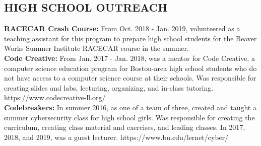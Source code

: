 \documentclass{res}
\begin{document}
\begin{resume}
\section{HIGH SCHOOL OUTREACH}
\vspace{0.1in}

\textbf{RACECAR Crash Course:} From Oct. 2018 - Jan. 2019, volunteered as a teaching assistant for
this program to prepare high school students for the Beaver Works Summer Institute RACECAR course in the summer. \\
\textbf{Code Creative:} From Jan. 2017 - Jan. 2018, was a mentor for Code Creative, a computer science education
program for Boston-area high school students who do not have access to a computer science course at their schools.
Was responsible for creating slides and labs, lecturing, organizing, and in-class tutoring.
https://www.codecreative-ll.org/ \\
\textbf{Codebreakers:} In summer 2016, as one of a team of three, created and taught a summer cybersecurity class for
high school girls.  Was responsible for creating the curriculum, creating class material and exercises, and leading
classes.  In 2017, 2018, and 2019, was a guest lecturer.  https://www.bu.edu/lernet/cyber/ \\






\end{resume}
\end{document}
